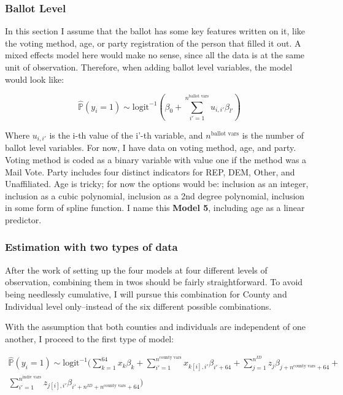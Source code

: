\documentclass[12pt,twoside]{reedthesis}
\begin{document}
  \subsubsection{Ballot Level}\label{ballot-level}
  
  In this section I assume that the ballot has some key features written
  on it, like the voting method, age, or party registration of the person
  that filled it out. A mixed effects model here would make no sense,
  since all the data is at the same unit of observation. Therefore, when
  adding ballot level variables, the model would look like:
  
  \begin{equation} \tag{Model 5}
  \hat{\mathbb{P}}(y_i = 1) \sim \text{logit}^{-1}(\beta_0 + \sum_{i' = 1}^{n^{\text{ballot vars}}}u_{i,i'}\beta_{l'})
  \end{equation}
  
  Where \(u_{i,i'}\) is the i-th value of the i'-th variable, and
  \(n^{\text{ballot vars}}\) is the number of ballot level variables. For
  now, I have data on voting method, age, and party. Voting method is
  coded as a binary variable with value one if the method was a Mail Vote.
  Party includes four distinct indicators for REP, DEM, Other, and
  Unaffiliated. Age is tricky; for now the options would be: inclusion as
  an integer, inclusion as a cubic polynomial, inclusion as a 2nd degree
  polynomial, inclusion in some form of spline function. I name this
  \textbf{Model 5}, including age as a linear predictor.
  
  \subsubsection{Estimation with two types of
  data}\label{estimation-with-two-types-of-data}
  
  After the work of setting up the four models at four different levels of
  observation, combining them in twos should be fairly straightforward. To
  avoid being needlessly cumulative, I will pursue this combination for
  County and Individual level only--instead of the six different possible
  combinations.
  
  With the assumption that both counties and individuals are independent
  of one another, I proceed to the first type of model:
  
  \begin{multline*}
  \hat{\mathbb{P}}(y_i = 1) \sim \text{logit}^{-1}(\sum_{k = 1}^{64}x_{k}\beta_{k} + \sum_{i'=1}^{n^{\text{county vars}}}x_{k[i], i'}\beta_{i'+64} + \sum_{j = 1}^{n^{ID}}z_{j}\beta_{j + n^{\text{county vars}} + 64} + \\ \sum_{i'=1}^{n^{\text{indiv vars}}}z_{j[i], i'}\beta_{i'+n^{ID} + n^{\text{county vars}} + 64})
  \end{multline*}
  
\end{document}
